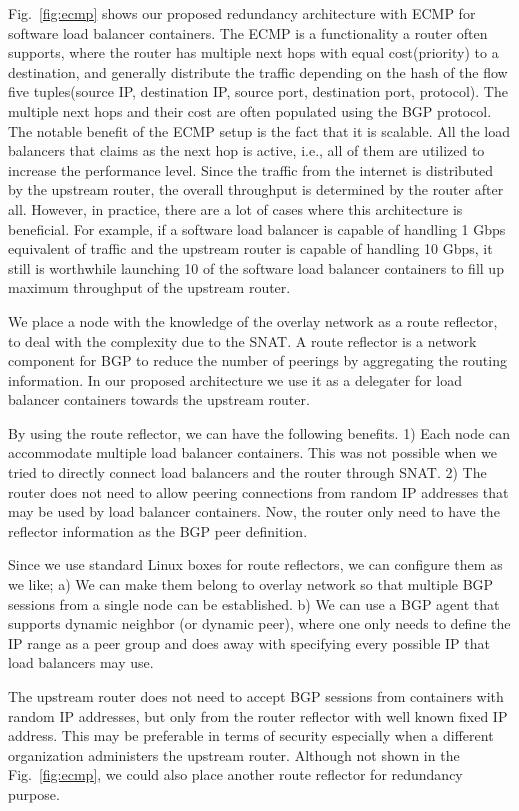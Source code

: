 Fig.~\ref{fig:ecmp} shows our proposed redundancy architecture with ECMP for software load balancer containers.
%
The ECMP is a functionality a router often supports, where the router has multiple next hops with equal cost(priority) to a destination, and generally distribute the traffic depending on the hash of the flow five tuples(source IP, destination IP, source port, destination port, protocol).
The multiple next hops and their cost are often populated using the BGP protocol.
%
The notable benefit of the ECMP setup is the fact that it is scalable.
All the load balancers that claims as the next hop is active, i.e., all of them are utilized to increase the performance level.
Since the traffic from the internet is distributed by the upstream router, the overall throughput is determined by the router after all.
However, in practice, there are a lot of cases where this architecture is beneficial.
For example, if a software load balancer is capable of handling 1 Gbps equivalent of traffic and the upstream router is capable of handling 10 Gbps, it still is worthwhile launching 10 of the software load balancer containers to fill up maximum throughput of the upstream router.

%
We place a node with the knowledge of the overlay network as a route reflector, to deal with the complexity due to the SNAT.
A route reflector is a network component for BGP to reduce the number of peerings by aggregating the routing information\cite{rfc4456}.
In our proposed architecture we use it as a delegater for load balancer containers towards the upstream router.

By using the route reflector, we can have the following benefits.
1) Each node can accommodate multiple load balancer containers. This was not possible when we tried to directly connect load balancers and the router through SNAT.
2) The router does not need to allow peering connections from random IP addresses that may be used by load balancer containers. Now, the router only need to have the reflector information as the BGP peer definition.

Since we use standard Linux boxes for route reflectors, we can configure them as we like;
a) We can make them belong to overlay network so that multiple BGP sessions from a single node can be established.
b) We can use a BGP agent that supports dynamic neighbor (or dynamic peer), where one only needs to define the IP range as a peer group and does away with specifying every possible IP that load balancers may use.

The upstream router does not need to accept BGP sessions from containers with random IP addresses, but only from the router reflector with well known fixed IP address. This may be preferable in terms of security especially when a different organization administers the upstream router.
Although not shown in the Fig.~\ref{fig:ecmp}, we could also place another route reflector for redundancy purpose.

